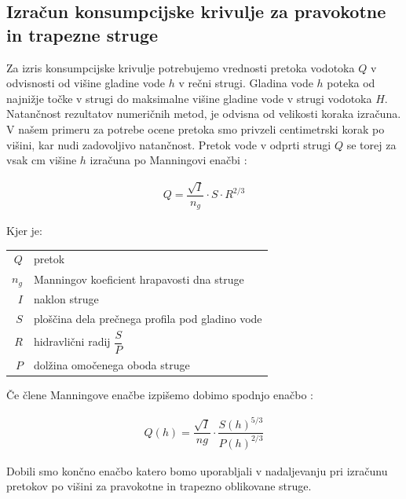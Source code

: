 \subsection{Izračun konsumpcijske krivulje za pravokotne in trapezne struge} \label{sec:teorija_trapeznaMetoda}
Za izris konsumpcijske krivulje potrebujemo vrednosti pretoka vodotoka $Q$ v odvisnosti od višine gladine vode $h$ v rečni strugi. Gladina vode $h$ poteka od najnižje točke v strugi do maksimalne višine gladine vode v strugi vodotoka $H$. Natančnost rezultatov numeričnih metod, je odvisna od velikosti koraka izračuna. V našem primeru za potrebe ocene pretoka smo privzeli centimetrski korak po višini, kar nudi zadovoljivo natančnost. Pretok vode v odprti strugi $Q$ se torej za vsak cm višine $h$ izračuna po Manningovi enačbi \cite{VenTeChow}: 

\begin{ceqn}
\begin{align}
Q = \dfrac{\sqrt{I}}{n_g} \cdot S \cdot R^{2/3} \label{eq:ManningovaEnacba}
\end{align}
\end{ceqn}


Kjer je:
\begin{table}[H]
	\begin{tabular}{r|p{10cm}}
		$Q$ & pretok \\
		$n_g$ & Manningov koeficient hrapavosti dna struge\\
		$I$ & naklon struge \\
		$S$ & ploščina dela prečnega profila pod gladino vode\\
		$R$ & hidravlični radij $\dfrac{S}{P}$\\
		$P$ & dolžina omočenega oboda struge\\
	\end{tabular}
\end{table}


\pagebreak

Če člene Manningove enačbe izpišemo dobimo spodnjo enačbo \cite{VenTeChow}:

\begin{ceqn}
	\begin{align}
	Q(h) = \dfrac{\sqrt{I}}{ng} \cdot \dfrac{S(h)^{5/3}}{P(h)^{2/3}} \label{eq:ManningovaEnacba}
	\end{align}
\end{ceqn}


Dobili smo končno enačbo katero bomo uporabljali v nadaljevanju pri izračunu pretokov po višini za pravokotne in trapezno oblikovane struge.



